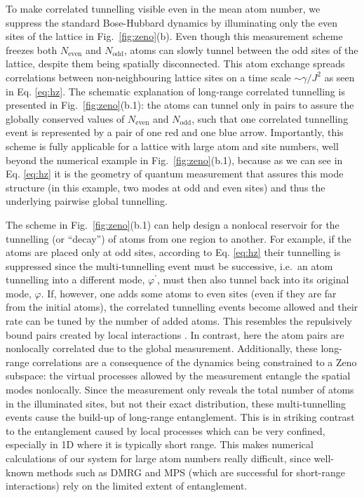 To make correlated tunnelling visible even in the mean atom number, we
suppress the standard Bose-Hubbard dynamics by illuminating only the
even sites of the lattice in Fig.~\ref{fig:zeno}(b). Even though this
measurement scheme freezes both $N_\text{even}$ and $N_\text{odd}$,
atoms can slowly tunnel between the odd sites of the lattice, despite
them being spatially disconnected. This atom exchange spreads
correlations between non-neighbouring lattice sites on a time scale
$\sim \gamma/J^2$ as seen in Eq. \eqref{eq:hz}. The schematic
explanation of long-range correlated tunnelling is presented in
Fig.~\ref{fig:zeno}(b.1): the atoms can tunnel only in pairs to assure
the globally conserved values of $N_\text{even}$ and $N_\text{odd}$,
such that one correlated tunnelling event is represented by a pair of
one red and one blue arrow. Importantly, this scheme is fully
applicable for a lattice with large atom and site numbers, well beyond
the numerical example in Fig.~\ref{fig:zeno}(b.1), because as we can
see in Eq. \eqref{eq:hz} it is the geometry of quantum measurement that
assures this mode structure (in this example, two modes at odd and
even sites) and thus the underlying pairwise global tunnelling.

The scheme in Fig.~\ref{fig:zeno}(b.1) can help design a nonlocal
reservoir for the tunnelling (or ``decay'') of atoms from one region to
another. For example, if the atoms are placed only at odd sites,
according to Eq. \eqref{eq:hz} their tunnelling is suppressed since the
multi-tunnelling event must be successive, i.e.~an atom tunnelling into
a different mode, $\varphi^\prime$, must then also tunnel back into
its original mode, $\varphi$. If, however, one adds some atoms to even
sites (even if they are far from the initial atoms), the correlated
tunnelling events become allowed and their rate can be tuned by the
number of added atoms. This resembles the repulsively bound pairs
created by local interactions \cite{winkler2006, folling2007}. In
contrast, here the atom pairs are nonlocally correlated due to the
global measurement. Additionally, these long-range correlations are a
consequence of the dynamics being constrained to a Zeno subspace: the
virtual processes allowed by the measurement entangle the spatial
modes nonlocally. Since the measurement only reveals the total number
of atoms in the illuminated sites, but not their exact distribution,
these multi-tunnelling events cause the build-up of long-range
entanglement. This is in striking contrast to the entanglement caused
by local processes which can be very confined, especially in 1D where
it is typically short range. This makes numerical calculations of our
system for large atom numbers really difficult, since well-known
methods such as DMRG and MPS \cite{schollwock2005} (which are
successful for short-range interactions) rely on the limited extent of
entanglement.

